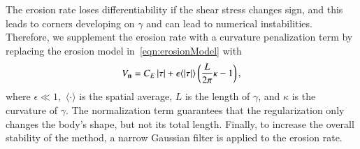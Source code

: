 \documentclass[preprint, 10pt]{elsarticle}
\begin{document}
The erosion rate loses differentiability if the shear stress changes
sign, and this leads to corners developing on $\gamma$ and can lead to
numerical instabilities.  Therefore, we supplement the erosion rate with
a curvature penalization term by replacing the erosion model
in~\eqref{eqn:erosionModel} with 
\begin{align}
  V_{\mathbf{n}} = C_E \, \lvert \tau \rvert + \epsilon \langle\lvert \tau \rvert\rangle \left(
    \frac{L}{2\pi} \kappa - 1 \right),
\end{align}
where $\epsilon \ll 1,$ $\langle \cdot \rangle$ is the spatial average,
$L$ is the length of $\gamma$, and $\kappa$ is the curvature of
$\gamma$.  The normalization term guarantees that the regularization
only changes the body's shape, but not its total length.  Finally, to
increase the overall stability of the method, a narrow Gaussian filter
is applied to the erosion rate.

\end{document}
